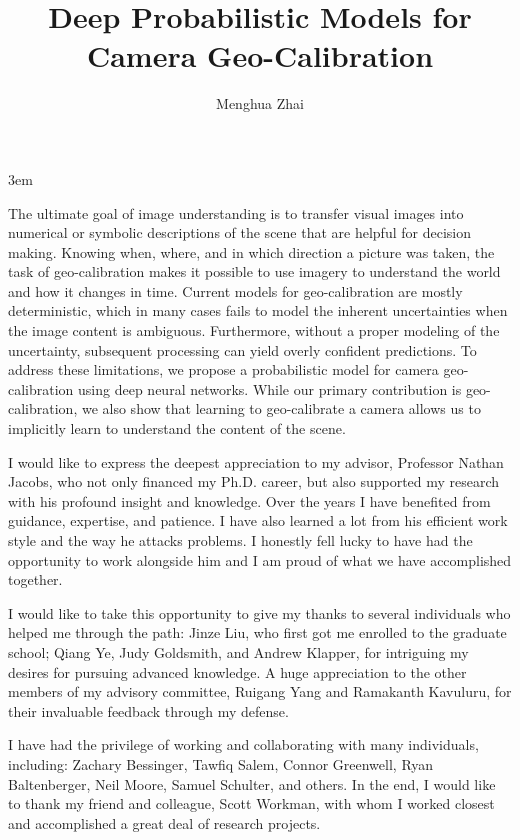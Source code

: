 \documentclass[final]{ukthesis}
\begin{document}
\emergencystretch 3em

\author{Menghua Zhai}
\title{Deep Probabilistic Models for Camera Geo-Calibration}

\abstract
{ \SingleSpacing
The ultimate goal of image understanding is to transfer visual
images into numerical or symbolic descriptions of the scene
that are helpful for decision making.
Knowing when, where, and in which direction a picture was taken, the
task of geo-calibration makes it possible to use imagery to understand
the world and how it changes in time. Current models for
geo-calibration are mostly deterministic, which in many cases fails to
model the inherent uncertainties when the image content is
ambiguous. Furthermore, without a proper modeling of the uncertainty, subsequent
processing can yield overly confident predictions.
To address these limitations, we propose a probabilistic model for
camera geo-calibration using deep neural networks.
While our primary contribution is geo-calibration, we also show that
learning to geo-calibrate a camera allows us to implicitly learn to
understand the content of the scene.
}


\frontmatter
\maketitle

\begin{acknowledgments}
  I would like to express the deepest appreciation to my advisor,
Professor Nathan Jacobs, who not only financed my Ph.D. career, but
also supported my research with his profound insight
and knowledge. Over the years I have benefited from guidance,
expertise, and patience. I have also learned a lot from his efficient
work style and the way he attacks problems. I honestly fell lucky to
have had the opportunity to work alongside him and I am proud of what
we have accomplished together.

I would like to take this opportunity to give my thanks to several
individuals who helped me through the path:  Jinze Liu, who
first got me enrolled to the graduate school; 
Qiang Ye, Judy Goldsmith, and Andrew Klapper, for intriguing
my desires for pursuing advanced knowledge. A huge appreciation to the
other members of my advisory committee, Ruigang Yang and Ramakanth
Kavuluru, for their invaluable feedback through my defense.

I have had the privilege of working and collaborating with many
individuals, including: Zachary Bessinger, Tawfiq Salem, Connor
Greenwell, Ryan Baltenberger, Neil Moore, Samuel Schulter, and others.
In the end, I would like to thank my friend and colleague, Scott
Workman, with whom I worked closest and accomplished a great deal of
research projects.
\end{acknowledgments}
\end{document}
